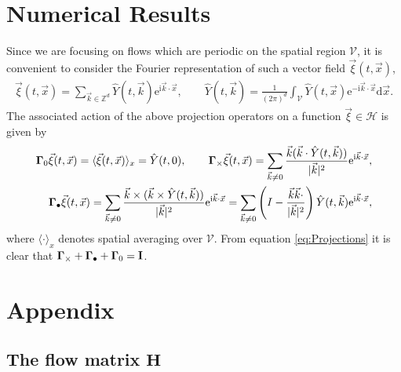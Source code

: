 \documentclass[11pt]{amsart}
\newcommand{\I}{\mathrm{i}}
\newcommand{\e}{\mathrm{e}}
\renewcommand{\d}{\mathrm{d}}
\newcommand{\Hb}{\mathbf{H}}
\newcommand{\Ib}{\mathbf{I}}
\newcommand{\Vc}{\mathcal{V}}
\newcommand{\Hs}{\mathscr{H}}
\newcommand\bGamma{\mbox{\boldmath${\Gamma}$}}
\begin{document}
\section{Numerical Results}\label{sec:Num_Results}
%
Since we are focusing on flows which are periodic on the spatial
region $\Vc$, it is convenient to consider the Fourier
representation of such a vector field $\vec{\xi}(t,\vec{x})$, 
%
\begin{align}
  \vec{\xi}(t,\vec{x})
    =\sum_{\vec{k}\in\mathbb{Z}^d}
       \hat{Y}(t,\vec{k})\e^{\I\vec{k}\cdot\vec{x}},
  \qquad
  \hat{Y}(t,\vec{k})
    =\frac{1}{(2\pi)^d}\int_{\Vc}
       \hat{Y}(t,\vec{x})\e^{-\I\vec{k}\cdot\vec{x}} \d\vec{x}.
\end{align}
%
The associated action of the above projection operators on a function
$\vec{\xi}\in\Hs$ is given by \cite{Fannjiang:SIAM_JAM:333} 
%
\begin{align}\label{eq:Projections}
  \bGamma_0\vec{\xi}(t,\vec{x})
    =\langle\vec{\xi}(t,\vec{x})\rangle_x
    =\hat{Y}(t,0),
    \qquad
  \bGamma_\times\vec{\xi}(t,\vec{x})
    =\sum_{\vec{k}\neq0}
       \frac{\vec{k}(\vec{k}\cdot\hat{Y}(t,\vec{k}))}{|\vec{k}|^2}
       \e^{\I\vec{k}\cdot\vec{x}},
    \\
  \bGamma_\bullet\vec{\xi}(t,\vec{x})
    =\sum_{\vec{k}\neq0}
       \frac{\vec{k}\times(\vec{k}\times\hat{Y}(t,\vec{k}))}{|\vec{k}|^2}
       \e^{\I\vec{k}\cdot\vec{x}}
    =\sum_{\vec{k}\neq0}\left(I-
       \frac{\vec{k}\vec{k}\cdot}{|\vec{k}|^2}\right) 
       \hat{Y}(t,\vec{k})  \e^{\I\vec{k}\cdot\vec{x}},
       \notag
\end{align}
%
where $\langle\cdot\rangle_x$ denotes spatial averaging over $\Vc$. From
equation \eqref{eq:Projections} it is clear that
$\bGamma_\times+\bGamma_\bullet+\bGamma_0=\Ib$. 


  \setcounter{equation}{1}  %
  \setcounter{section}{0}  %
  \renewcommand{\theequation}{A-\arabic{equation}} 
\renewcommand{\thesection}{A-\arabic{section}}
%
\section{Appendix} 
\label{sec:Appendix}
%
\subsection{The flow matrix $\Hb$}\label{eq:flow_matrix}
%
\end{document}
